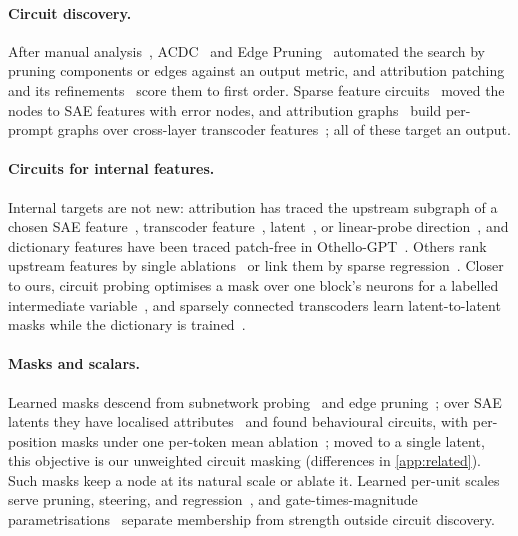 \documentclass[10pt]{article}
\begin{document}
\paragraph{Circuit discovery.}
After manual analysis~\citep{olah2020zoom, wang2023interpretability}, ACDC~\citep{conmy2023towards} and Edge Pruning~\citep{bhaskar2024finding} automated the search by pruning components or edges against an output metric, and attribution patching~\citep{nanda2023attribution, syed2023attribution, kramar2024atp} and its refinements~\citep{hanna2024faith, rezaeijafari2025relp} score them to first order.
Sparse feature circuits~\citep{marks2025sparse} moved the nodes to SAE features with error nodes, and attribution graphs~\citep{ameisen2025circuit, lindsey2025biology} build per-prompt graphs over cross-layer transcoder features~\citep{dunefsky2024transcoders}; all of these target an output.

\paragraph{Circuits for internal features.}
Internal targets are not new: attribution has traced the upstream subgraph of a chosen SAE feature~\citep{ge2024automatically}, transcoder feature~\citep{dunefsky2024transcoders, golimblevskaia2025circuit}, latent~\citep{duprelatour2025debugging}, or linear-probe direction~\citep{palit2026probes}, and dictionary features have been traced patch-free in Othello-GPT~\citep{he2024dictionary}.
Others rank upstream features by single ablations~\citep{cunningham2024sparse} or link them by sparse regression~\citep{yin2026scalable}.
Closer to ours, circuit probing optimises a mask over one block's neurons for a labelled intermediate variable~\citep{lepori2023uncovering}, and sparsely connected transcoders learn latent-to-latent masks while the dictionary is trained~\citep{drori2025sparsely}.

\paragraph{Masks and scalars.}
Learned masks descend from subnetwork probing~\citep{cao2021low, conmy2023towards} and edge pruning~\citep{bhaskar2024finding, li2024optimal}; over SAE latents they have localised attributes~\citep{chaudhary2024evaluating} and found behavioural circuits, with per-position masks under one per-token mean ablation~\citep{caples2025scaling}; moved to a single latent, this objective is our unweighted circuit masking (differences in \cref{app:related}).
Such masks keep a node at its natural scale or ablate it.
Learned per-unit scales serve pruning, steering, and regression~\citep{liu2017learning, kwon2022fast, stoehr2024activation, yin2026scalable}, and gate-times-magnitude parametrisations~\citep{louizos2018learning, lai2025joint} separate membership from strength outside circuit discovery.
\end{document}
